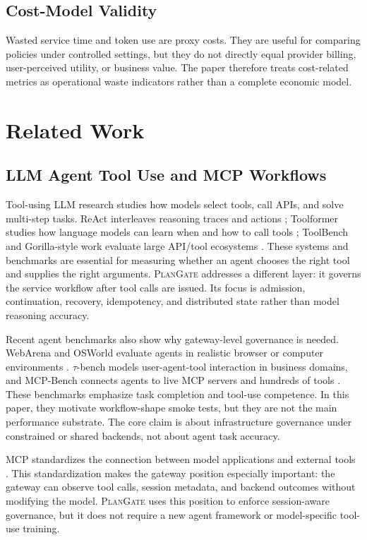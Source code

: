 \documentclass[5p,times]{elsarticle}
\newcommand{\plangate}{\textsc{PlanGate}\xspace}
\begin{document}
\subsection{Cost-Model Validity}

Wasted service time and token use are proxy costs. They are useful for comparing policies under controlled settings, but they do not directly equal provider billing, user-perceived utility, or business value. The paper therefore treats cost-related metrics as operational waste indicators rather than a complete economic model.

\section{Related Work}
\label{sec:related_work}

\subsection{LLM Agent Tool Use and MCP Workflows}

Tool-using LLM research studies how models select tools, call APIs, and solve multi-step tasks. ReAct interleaves reasoning traces and actions \citep{yao2023react}; Toolformer studies how language models can learn when and how to call tools \citep{schick2023toolformer}; ToolBench and Gorilla-style work evaluate large API/tool ecosystems \citep{qin2024toolbench,patil2023gorilla}. These systems and benchmarks are essential for measuring whether an agent chooses the right tool and supplies the right arguments. \plangate addresses a different layer: it governs the service workflow after tool calls are issued. Its focus is admission, continuation, recovery, idempotency, and distributed state rather than model reasoning accuracy.

Recent agent benchmarks also show why gateway-level governance is needed. WebArena and OSWorld evaluate agents in realistic browser or computer environments \citep{zhou2023webarena,xie2024osworld}. $\tau$-bench models user-agent-tool interaction in business domains, and MCP-Bench connects agents to live MCP servers and hundreds of tools \citep{taubench2024,mcpbench2025}. These benchmarks emphasize task completion and tool-use competence. In this paper, they motivate workflow-shape smoke tests, but they are not the main performance substrate. The core claim is about infrastructure governance under constrained or shared backends, not about agent task accuracy.

MCP standardizes the connection between model applications and external tools \citep{anthropic2024mcp}. This standardization makes the gateway position especially important: the gateway can observe tool calls, session metadata, and backend outcomes without modifying the model. \plangate uses this position to enforce session-aware governance, but it does not require a new agent framework or model-specific tool-use training.
\end{document}
